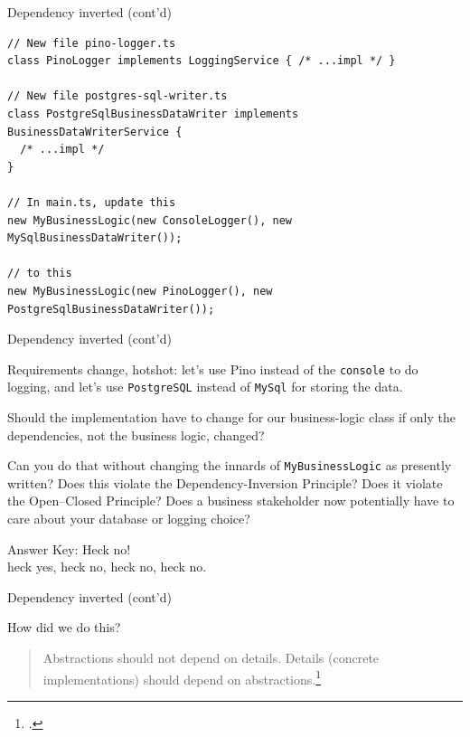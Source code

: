 \documentclass[aspectratio=169]{beamer}
\begin{document}
\begin{frame}[fragile]{Dependency inverted (cont'd)}
  \begin{lstlisting}[basicstyle=\footnotesize]
// New file pino-logger.ts
class PinoLogger implements LoggingService { /* ...impl */ }

// New file postgres-sql-writer.ts
class PostgreSqlBusinessDataWriter implements BusinessDataWriterService {
  /* ...impl */ 
}

// In main.ts, update this
new MyBusinessLogic(new ConsoleLogger(), new MySqlBusinessDataWriter());

// to this
new MyBusinessLogic(new PinoLogger(), new PostgreSqlBusinessDataWriter());
  \end{lstlisting}
\end{frame}

\begin{frame}{Dependency inverted (cont'd)}

  Requirements change, hotshot: let's use Pino instead of the
  \lstinline{console} to do logging, and let's use \lstinline{PostgreSQL}
  instead of \lstinline{MySql} for storing the data.

  \vspace{1em}

  Should the implementation have to change for our business-logic class if only
  the dependencies, not the business logic, changed?

  \vspace{1em}

  Can you do that without changing the innards of \lstinline{MyBusinessLogic} as
  presently written? Does this violate the Dependency-Inversion Principle? Does
  it violate the Open--Closed Principle? Does a business stakeholder now
  potentially have to care about your database or logging choice?

  \vspace{1em}

  Answer Key: Heck no! \\
  heck yes, heck no, heck no, heck no.

\end{frame}

\begin{frame}{Dependency inverted (cont'd)}

  How did we do this?

  \vspace{1em}

  \begin{quote}

    Abstractions should not depend on details. Details (concrete
    implementations) should depend on abstractions.\footcite{enwiki:1148320529}

  \end{quote}

\end{frame}
\end{document}
